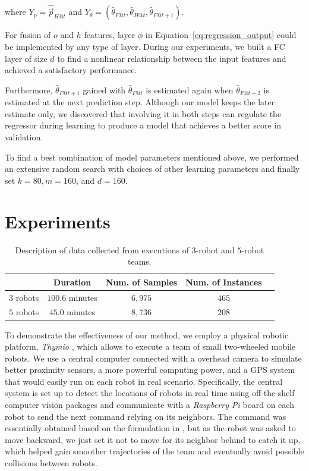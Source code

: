 \documentclass[letterpaper, 10 pt, conference]{ieeeconf}  %
\begin{document}
	where 
	$Y_{p} = \hat{\vec{p}}_{H@t}$ and
	$Y_{\theta} = (\hat{\theta}_{F@t}, \hat{\theta}_{H@t}, \hat{\theta}_{F@t+1})$.
	
	For fusion of $o$ and $h$ features, layer $\phi$ in Equation~\ref{eq:regression_output} 
	could be implemented by any type of layer. During our experiments, we 
	built a FC layer of size $d$ to find a nonlinear relationship between the input 
	features and achieved a satisfactory performance. 
	
	Furthermore, $\hat{\theta}_{F@t+1}$ gained with $\hat{\theta}_{F@t}$ is
	estimated again when $\hat{\theta}_{F@t+2}$ is estimated at the next 
	prediction step. Although our model keeps the later estimate only, 
	we discovered that involving it in both steps can regulate the regressor 
	during learning to produce a model that achieves a better score in validation. 
	
	To find a best combination of model parameters mentioned above, we performed 
	an extensive random search with choices of other learning parameters and 
	finally set $k=80, m=160$, and $d=160$. 
	
	
	\section{Experiments} 
	\label{sec:experiments} 
	
	\setlength{\tabcolsep}{0.5em} %
	{\renewcommand{\arraystretch}{1.2}%
		\begin{table}[t]
			\label{table:data_description}
			\centering
			\begin{tabular}{|c|c|c|c|c|}
				\hline
							&  Duration & Num. of Samples & Num. of Instances  \\ \hline
				$3$ robots & $100.6$ minutes & $6,975$ & $465$  \\ \hline
				$5$ robots & $45.0$ minutes  & $8,736$ & $208$  \\ \hline
			\end{tabular}
			\caption{Description of data collected from executions of $3$-robot and $5$-robot teams.}
		\end{table}
	}	
	
	To demonstrate the effectiveness of our method, we employ a physical robotic platform, 
	\emph{Thymio} \cite{Shin14}, which allows to execute a team of small two-wheeled 
	mobile robots. We use a central computer connected with a overhead camera to simulate
	better proximity 
	sensors, a more powerful computing power, and a GPS system that would easily run on each robot in 
	real scenario. 
	Specifically, the central system is set up to detect the locations of robots in real
	time using off-the-shelf computer vision packages 
	and communicate with a \emph{Raspberry Pi} board \cite{Upton14} on each robot to send
	the next command relying on its neighbors. 
	The command was essentially obtained based on the formulation in \cite{CPR17}, but 
    as the robot was asked to move backward, we just set it not to move for its 
	neighbor behind to catch it up, which helped gain smoother trajectories of the team
	and eventually avoid possible collisions between robots. 
	
\end{document}
